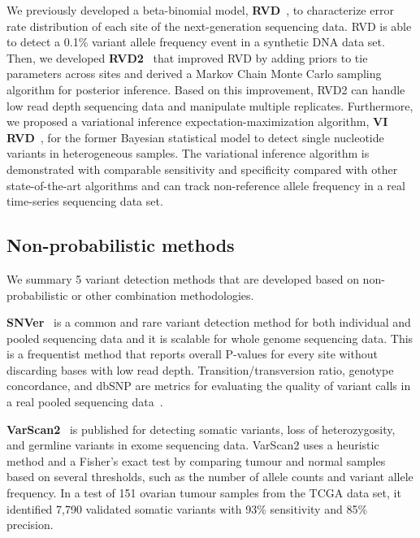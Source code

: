 \documentclass[a4,center,fleqn]{NAR}
\begin{document}
We previously developed a beta-binomial model, \textbf{RVD}~\citep{Flaherty2012}, to characterize error rate distribution of each site of the next-generation sequencing data.
RVD is able to detect a 0.1\% variant allele frequency event in a synthetic DNA data set.
Then, we developed \textbf{RVD2}~\citep{He2015} that improved RVD by adding priors to tie parameters across sites and derived a Markov Chain Monte Carlo sampling algorithm for posterior inference.
Based on this improvement, RVD2 can handle low read depth sequencing data and manipulate multiple replicates.
Furthermore, we proposed a variational inference expectation-maximization algorithm, \textbf{VI RVD}~\citep{zhang2016variational}, for the former Bayesian statistical model to detect single nucleotide variants in heterogeneous samples.
The variational inference algorithm is demonstrated with comparable sensitivity and specificity compared with other state-of-the-art algorithms and can track non-reference allele frequency in a real time-series sequencing data set.


\subsection{Non-probabilistic methods}

We summary 5 variant detection methods that are developed based on non-probabilistic or other combination methodologies.

\textbf{SNVer}~\citep{Wei2011} is a common and rare variant detection method for both individual and pooled sequencing data and it is scalable for whole genome sequencing data.
This is a frequentist method that reports overall P-values for every site without discarding bases with low read depth.
Transition/transversion ratio, genotype concordance, and dbSNP are metrics for evaluating the quality of variant calls in a real pooled sequencing data~\citep{depristo2011framework}.

\textbf{VarScan2}~\citep{Koboldt2012} is published for detecting somatic variants, loss of heterozygosity, and germline variants in exome sequencing data.
VarScan2 uses a heuristic method and a Fisher's exact test by comparing tumour and normal samples based on several thresholds, such as the number of allele counts and variant allele frequency.
In a test of 151 ovarian tumour samples from the TCGA data set, it identified 7,790 validated somatic variants with 93\% sensitivity and 85\% precision.
\end{document}
